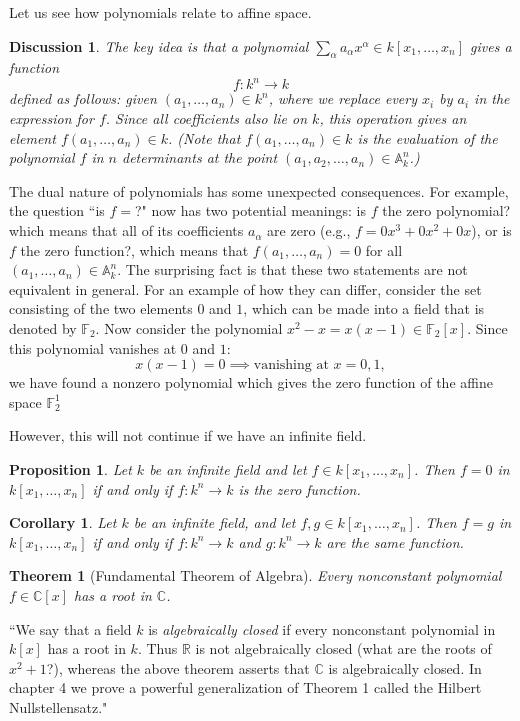 \documentclass[12pt,reqno]{amsart}
\theoremstyle{plain}
\newtheorem{theorem}{Theorem}
\newtheorem{disc}{Discussion}
\newtheorem{prop}{Proposition}
\newtheorem{coro}{Corollary}
\newcommand{\aff}{\mathbb A}
\newcommand{\ff}{\mathbb F}
\newcommand{\pring}{k[x_1, \ldots , x_n]}
\newcommand{\poly}{\sum_{\alpha} a_{\alpha} x^{\alpha}}
\newcommand{\rr}{\mathbb R}
\newcommand{\cc}{\mathbb C}
\begin{document}
Let us see how polynomials relate to affine space. 
\begin{disc} The key idea is that a polynomial $\poly \in \pring$ gives a function $$f \colon k^n \to k$$ defined as follows: given $(a_1, \ldots , a_n) \in k^n$, where we replace every $x_i$ by $a_i$ in the expression for $f$. Since all coefficients also lie on $k$, this operation gives an element $f (a_1, \ldots, a_n) \in k$. (Note that $f(a_1, \ldots, a_n) \in k$ is the evaluation of the polynomial $f$ in $n$ determinants at the point $(a_1, a_2, \ldots , a_n) \in \aff_{k}^n$.)
\end{disc}

The dual nature of polynomials has some unexpected consequences. For example, the question ``is $f =$?" now has two potential meanings: is $f$ the zero polynomial? which means that all of its coefficients $a_{\alpha}$ are zero (e.g., $f = 0x^3 + 0x^2 +0x$), or is $f$ the zero function?, which means that $f(a_1, \ldots , a_n) = 0$ for all $(a_1, \ldots, a_n) \in \aff_k^n$. The surprising fact is that these two statements are not equivalent in general. For an example of how they can differ, consider the set consisting of the two elements $0$ and $1$, which can be made into a field that is denoted by $\ff_2$. Now consider the polynomial $x^2 - x = x(x-1) \in \ff_2[x]$. Since this polynomial vanishes at $0$ and $1$: $$x(x-1) = 0 \implies \text{vanishing at }x =0, 1 ,$$ we have found a nonzero polynomial which gives the zero function of the affine space $\ff_2^1$

However, this will not continue if we have an infinite field.
\begin{prop} Let $k$ be an infinite field and let $f \in k [x_1, \ldots, x_n]$. Then $f = 0$ in $k[x_1, \ldots, x_n]$ if and only if $f \colon k^n \to k$ is the zero function.
\end{prop}


\begin{coro} Let $k$ be an infinite field, and let $f, g \in  \pring $. Then $f = g$ in $\pring$ if and only if $f \colon k^n \to k$ and $g \colon k^n \to k$ are the same function.
\end{coro} 

\begin{theorem}[Fundamental Theorem of Algebra] Every nonconstant polynomial $f \in \cc[x]$ has a root in $\cc$.
\end{theorem}

``We say that a field $k$ is \textit{algebraically closed} if every nonconstant polynomial in $k[x]$ has a root in $k$. Thus $\rr$ is not algebraically closed (what are the roots of $x^2 + 1 $?), whereas the above theorem asserts that $\cc$ is algebraically closed. In chapter 4 we prove a powerful generalization of Theorem 1 called the Hilbert Nullstellensatz."
\end{document}
